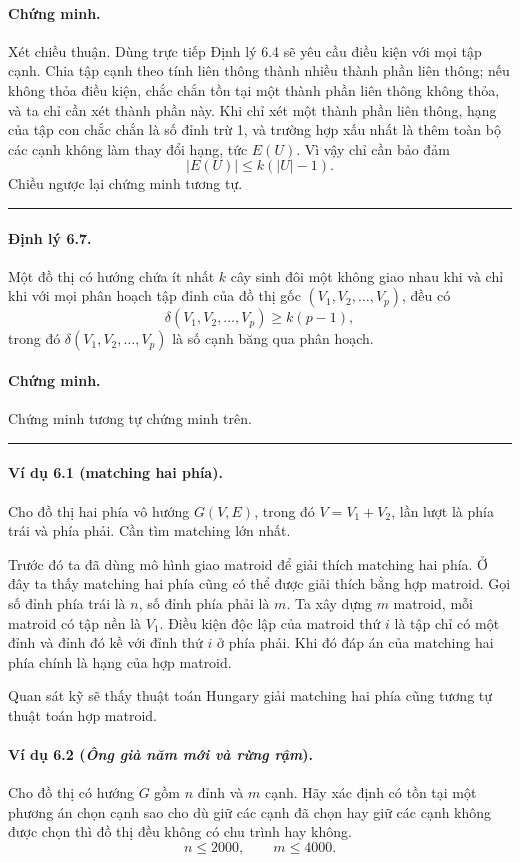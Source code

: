 \documentclass[11pt]{article}
\newcommand{\qedmark}{\hfill\rule{0.7ex}{0.7ex}}
\begin{document}
\paragraph{Chứng minh.}
Xét chiều thuận. Dùng trực tiếp Định lý 6.4 sẽ yêu cầu điều kiện với mọi tập
cạnh. Chia tập cạnh theo tính liên thông thành nhiều thành phần liên thông; nếu
không thỏa điều kiện, chắc chắn tồn tại một thành phần liên thông không thỏa, và
ta chỉ cần xét thành phần này. Khi chỉ xét một thành phần liên thông, hạng của
tập con chắc chắn là số đỉnh trừ 1, và trường hợp xấu nhất là thêm toàn bộ các
cạnh không làm thay đổi hạng, tức \(E(U)\). Vì vậy chỉ cần bảo đảm
\[
  |E(U)|\le k(|U|-1).
\]
Chiều ngược lại chứng minh tương tự. \qedmark

\paragraph{Định lý 6.7.}
Một đồ thị có hướng chứa ít nhất \(k\) cây sinh đôi một không giao nhau khi và
chỉ khi với mọi phân hoạch tập đỉnh của đồ thị gốc
\((V_1,V_2,\ldots,V_p)\), đều có
\[
  \delta(V_1,V_2,\ldots,V_p)\ge k(p-1),
\]
trong đó \(\delta(V_1,V_2,\ldots,V_p)\) là số cạnh băng qua phân hoạch.

\paragraph{Chứng minh.}
Chứng minh tương tự chứng minh trên. \qedmark

\paragraph{Ví dụ 6.1 (matching hai phía).}
Cho đồ thị hai phía vô hướng \(G(V,E)\), trong đó \(V=V_1+V_2\), lần lượt là
phía trái và phía phải. Cần tìm matching lớn nhất.

Trước đó ta đã dùng mô hình giao matroid để giải thích matching hai phía. Ở đây
ta thấy matching hai phía cũng có thể được giải thích bằng hợp matroid. Gọi số
đỉnh phía trái là \(n\), số đỉnh phía phải là \(m\). Ta xây dựng \(m\) matroid,
mỗi matroid có tập nền là \(V_1\). Điều kiện độc lập của matroid thứ \(i\) là
tập chỉ có một đỉnh và đỉnh đó kề với đỉnh thứ \(i\) ở phía phải. Khi đó đáp án
của matching hai phía chính là hạng của hợp matroid.

Quan sát kỹ sẽ thấy thuật toán Hungary giải matching hai phía cũng tương tự
thuật toán hợp matroid.

\paragraph{Ví dụ 6.2 (\emph{Ông già năm mới và rừng rậm}).}
Cho đồ thị có hướng \(G\) gồm \(n\) đỉnh và \(m\) cạnh. Hãy xác định có tồn tại
một phương án chọn cạnh sao cho dù giữ các cạnh đã chọn hay giữ các cạnh không
được chọn thì đồ thị đều không có chu trình hay không.
\[
  n\le 2000,\qquad m\le 4000.
\]
\end{document}
